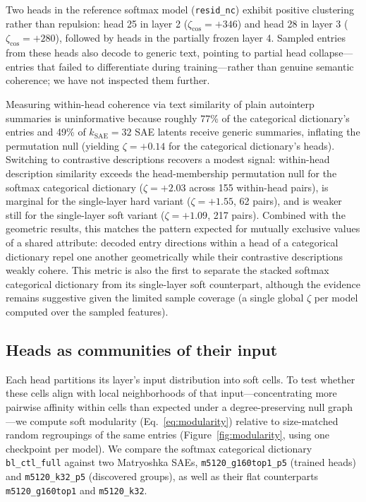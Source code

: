 Two heads in the reference softmax model (\texttt{resid\_nc})
exhibit positive clustering rather than repulsion: head 25 in layer 2
($\zeta_{\cos}{=}{+}346$) and head 28 in layer 3
($\zeta_{\cos}{=}{+}280$), followed by heads in the partially frozen
layer 4. Sampled entries from these heads also decode to generic text,
pointing to partial head collapse---entries that failed to differentiate
during training---rather than genuine semantic coherence; we have not
inspected them further.

Measuring within-head coherence via text similarity of plain autointerp
summaries is uninformative because roughly 77\% of the categorical
dictionary's entries and 49\% of $k_{\mathrm{SAE}}{=}32$ SAE latents
receive generic summaries, inflating the permutation null (yielding
$\zeta{=}{+}0.14$ for the categorical dictionary's heads). Switching to
contrastive descriptions recovers a modest signal: within-head
description similarity exceeds the head-membership permutation null for
the softmax categorical dictionary ($\zeta{=}{+}2.03$ across 155
within-head pairs), is marginal for the single-layer hard variant
($\zeta{=}{+}1.55$, 62 pairs), and is weaker
still for the single-layer soft variant ($\zeta{=}{+}1.09$, 217 pairs).
Combined with the geometric results, this matches the pattern expected
for mutually exclusive values of a shared attribute: decoded entry
directions within a head of a categorical dictionary repel one another
geometrically while their contrastive descriptions weakly cohere. This
metric is also the first to separate the stacked softmax categorical
dictionary from its single-layer soft counterpart, although the evidence
remains suggestive given the limited sample coverage (a single global
$\zeta$ per model computed over the sampled features).

\subsection{Heads as communities of their input}
\label{sec:modularity}

Each head partitions its layer's input distribution into soft cells. To
test whether these cells align with local neighborhoods of that
input---concentrating more pairwise affinity within cells than expected
under a degree-preserving null graph---we compute soft modularity
(Eq.~\eqref{eq:modularity}) relative to size-matched random regroupings
of the same entries (Figure~\ref{fig:modularity}, using one checkpoint
per model). We compare the softmax categorical dictionary
\texttt{bl\_ctl\_full} against two Matryoshka SAEs,
\texttt{m5120\_g160top1\_p5} (trained heads)
and \texttt{m5120\_k32\_p5} (discovered groups), as well as their flat
counterparts \texttt{m5120\_g160top1} and \texttt{m5120\_k32}.


